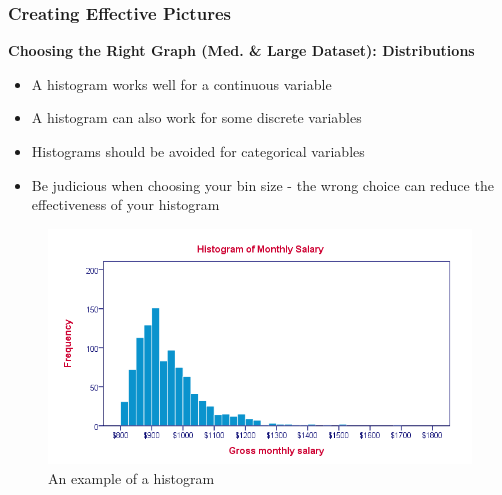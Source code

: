 \documentclass{beamer}
\begin{document}
\begin{frame}
\frametitle{Creating Effective Pictures}
\textbf{Choosing the Right Graph (Med. \& Large Dataset): Distributions}\\
\vspace{0.2cm}
\begin{itemize}
\item A histogram works well for a continuous variable
\vspace{0.1cm}
\item A histogram can also work for some discrete variables
\vspace{0.1cm}
\item Histograms should be avoided for categorical variables
\vspace{0.1cm}
\item Be judicious when choosing your bin size - the wrong choice can reduce the effectiveness of your histogram
\end{itemize}
\vspace{-0.1cm}
\begin{figure}
\includegraphics[scale=0.25]{histogram}
\vspace{-0.4cm}
\caption{An example of a histogram}
\end{figure}
\end{frame}

\end{document}
